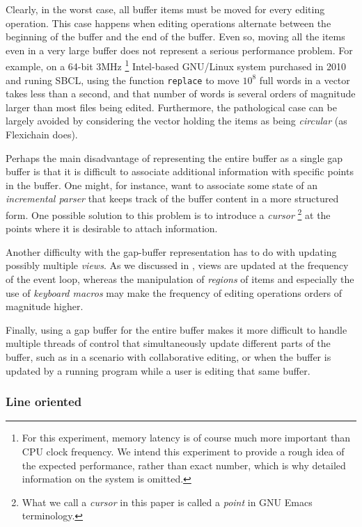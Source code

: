 Clearly, in the worst case, all buffer items must be moved for every
editing operation.  This case happens when editing operations
alternate between the beginning of the buffer and the end of the
buffer.  Even so, moving all the items even in a very large buffer
does not represent a serious performance problem.  For example, on a
64-bit 3MHz%
\footnote{For this experiment, memory latency is of course much more
  important than CPU clock frequency.  We intend this experiment to
  provide a rough idea of the expected performance, rather than exact
  number, which is why detailed information on the system is omitted.}
Intel-based GNU/Linux system purchased in 2010 and runing
SBCL, using the \commonlisp{} function \texttt{replace} to move $10^8$
full words in a vector takes less than a second, and that number of
words is several orders of magnitude larger than most files being
edited.  Furthermore, the pathological case can be largely avoided by
considering the vector holding the items as being \emph{circular} (as
Flexichain \cite{flexichain} does).

Perhaps the main disadvantage of representing the entire buffer as a
single gap buffer is that it is difficult to associate additional
information with specific points in the buffer.  One might, for
instance, want to associate some state of an \emph{incremental parser}
that keeps track of the buffer content in a more structured form.
One possible solution to this problem is to introduce a \emph{cursor}%
\footnote{What we call a \emph{cursor} in this paper is called a
  \emph{point} in GNU Emacs terminology.} at the points where it is
desirable to attach information.

Another difficulty with the gap-buffer representation has to do with
updating possibly multiple \emph{views}.  As we discussed in
, views are updated at the frequency of the
event loop, whereas the manipulation of \emph{regions} of items and
especially the use of \emph{keyboard macros} may make the frequency of
editing operations orders of magnitude higher.

Finally, using a gap buffer for the entire buffer makes it more
difficult to handle multiple threads of control that simultaneously
update different parts of the buffer, such as in a scenario with
collaborative editing, or when the buffer is updated by a running
program while a user is editing that same buffer.

\subsubsection{Line oriented}
\label{sec-previous-line-oriented}

